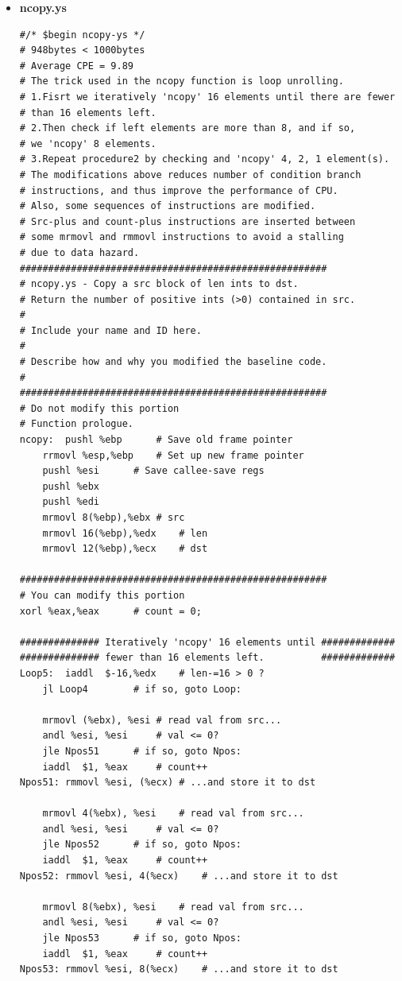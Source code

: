 \documentclass{article}
\begin{document}
\begin{itemize}
\item \textbf{ncopy.ys}
  \begin{lstlisting}[caption={}]
#/* $begin ncopy-ys */
# 948bytes < 1000bytes
# Average CPE = 9.89
# The trick used in the ncopy function is loop unrolling.
# 1.Fisrt we iteratively 'ncopy' 16 elements until there are fewer 
# than 16 elements left.
# 2.Then check if left elements are more than 8, and if so,
# we 'ncopy' 8 elements.
# 3.Repeat procedure2 by checking and 'ncopy' 4, 2, 1 element(s).
# The modifications above reduces number of condition branch 
# instructions, and thus improve the performance of CPU. 
# Also, some sequences of instructions are modified.
# Src-plus and count-plus instructions are inserted between
# some mrmovl and rmmovl instructions to avoid a stalling
# due to data hazard.
######################################################
# ncopy.ys - Copy a src block of len ints to dst.
# Return the number of positive ints (>0) contained in src.
#
# Include your name and ID here.
#
# Describe how and why you modified the baseline code.
#
######################################################
# Do not modify this portion
# Function prologue.
ncopy:	pushl %ebp		# Save old frame pointer
	rrmovl %esp,%ebp	# Set up new frame pointer
	pushl %esi		# Save callee-save regs
	pushl %ebx
	pushl %edi
	mrmovl 8(%ebp),%ebx	# src
	mrmovl 16(%ebp),%edx	# len
	mrmovl 12(%ebp),%ecx	# dst

######################################################
# You can modify this portion
xorl %eax,%eax		# count = 0;

############## Iteratively 'ncopy' 16 elements until #############
############## fewer than 16 elements left. 	     #############		
Loop5:	iaddl  $-16,%edx	# len-=16 > 0 ?
	jl Loop4		# if so, goto Loop:

	mrmovl (%ebx), %esi	# read val from src...
	andl %esi, %esi		# val <= 0?
	jle Npos51		# if so, goto Npos:
	iaddl  $1, %eax		# count++
Npos51:	rmmovl %esi, (%ecx)	# ...and store it to dst

	mrmovl 4(%ebx), %esi	# read val from src...
	andl %esi, %esi		# val <= 0?
	jle Npos52		# if so, goto Npos:
	iaddl  $1, %eax		# count++
Npos52:	rmmovl %esi, 4(%ecx)	# ...and store it to dst

	mrmovl 8(%ebx), %esi	# read val from src...
	andl %esi, %esi		# val <= 0?
	jle Npos53		# if so, goto Npos:
	iaddl  $1, %eax		# count++
Npos53:	rmmovl %esi, 8(%ecx)	# ...and store it to dst


\end{lstlisting}
\end{itemize}
\end{document}
